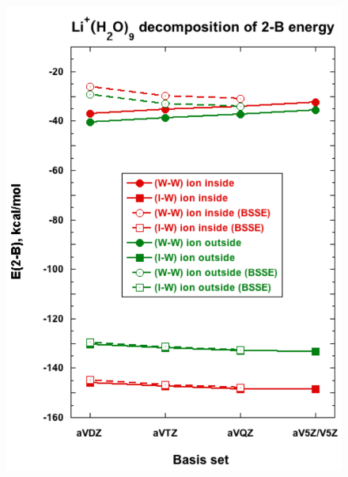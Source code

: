 \documentclass[11pt, proquest]{uwthesis}[2020/02/24]
\begin{document}
\begin{figure}[t]
\uwsinglespace
\begin{center}
\begin{minipage}{0.45\textwidth}
\includegraphics[width=.9\textwidth]{Figures/Chapter_3/figure_3_left.pdf}
\end{minipage}
\begin{minipage}{0.45\textwidth}

\end{minipage}
\end{center}
\end{figure}
\end{document}
